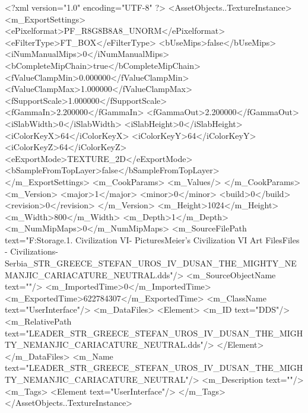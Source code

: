 <?xml version="1.0" encoding="UTF-8" ?>
<AssetObjects..TextureInstance>
	<m_ExportSettings>
		<ePixelformat>PF_R8G8B8A8_UNORM</ePixelformat>
		<eFilterType>FT_BOX</eFilterType>
		<bUseMips>false</bUseMips>
		<iNumManualMips>0</iNumManualMips>
		<bCompleteMipChain>true</bCompleteMipChain>
		<fValueClampMin>0.000000</fValueClampMin>
		<fValueClampMax>1.000000</fValueClampMax>
		<fSupportScale>1.000000</fSupportScale>
		<fGammaIn>2.200000</fGammaIn>
		<fGammaOut>2.200000</fGammaOut>
		<iSlabWidth>0</iSlabWidth>
		<iSlabHeight>0</iSlabHeight>
		<iColorKeyX>64</iColorKeyX>
		<iColorKeyY>64</iColorKeyY>
		<iColorKeyZ>64</iColorKeyZ>
		<eExportMode>TEXTURE_2D</eExportMode>
		<bSampleFromTopLayer>false</bSampleFromTopLayer>
	</m_ExportSettings>
	<m_CookParams>
		<m_Values/>
	</m_CookParams>
	<m_Version>
		<major>1</major>
		<minor>0</minor>
		<build>0</build>
		<revision>0</revision>
	</m_Version>
	<m_Height>1024</m_Height>
	<m_Width>800</m_Width>
	<m_Depth>1</m_Depth>
	<m_NumMipMaps>0</m_NumMipMaps>
	<m_SourceFilePath text="F:\Mod Storage\2.1. Civilization VI\Mods\Archive - Pictures\Sid Meier's Civilization VI Art Files\Art Files - Civilizations\Civilization - Serbia\LEADER_STR_GREECE_STEFAN_UROS_IV_DUSAN_THE_MIGHTY_NEMANJIC_CARIACATURE_NEUTRAL.dds"/>
	<m_SourceObjectName text=""/>
	<m_ImportedTime>0</m_ImportedTime>
	<m_ExportedTime>622784307</m_ExportedTime>
	<m_ClassName text="UserInterface"/>
	<m_DataFiles>
		<Element>
			<m_ID text="DDS"/>
			<m_RelativePath text="LEADER_STR_GREECE_STEFAN_UROS_IV_DUSAN_THE_MIGHTY_NEMANJIC_CARIACATURE_NEUTRAL.dds"/>
		</Element>
	</m_DataFiles>
	<m_Name text="LEADER_STR_GREECE_STEFAN_UROS_IV_DUSAN_THE_MIGHTY_NEMANJIC_CARIACATURE_NEUTRAL"/>
	<m_Description text=""/>
	<m_Tags>
		<Element text="UserInterface"/>
	</m_Tags>
</AssetObjects..TextureInstance>


